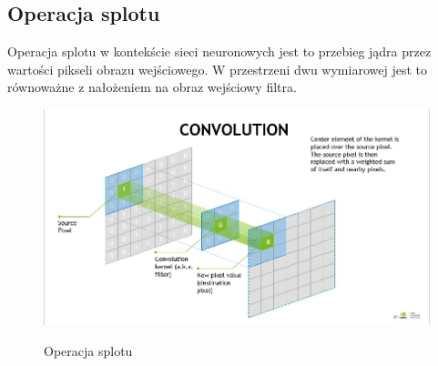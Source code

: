 \documentclass{article}
\begin{document}
\subsection{Operacja splotu}
Operacja splotu w kontekście sieci neuronowych jest to przebieg jądra przez wartości pikseli obrazu wejściowego.
W przestrzeni dwu wymiarowej jest to równoważne z nałożeniem na obraz wejściowy filtra.
\begin{figure}[H]
    \centering
    \includegraphics[width=\linewidth]{images/conv.png}
    \caption{Operacja splotu}
    \cite{nvidia}
\end{figure}
\end{document}
